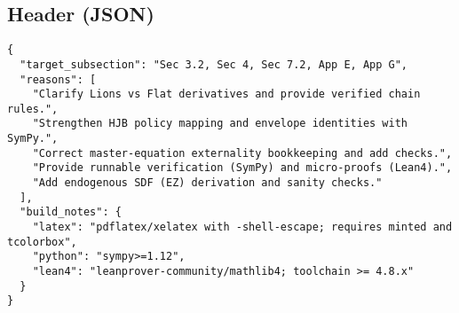 ﻿\documentclass[11pt,letterpaper,oneside]{article}
\numberwithin{equation}{section}
\newcommand{\1}{\mathbf{1}}
\begin{document}
\begin{tcolorbox}[didacticstyle]
\begin{itemize}[leftmargin=1.1em,itemsep=0.25em]
\subsection*{Header (JSON)}
\begin{tcolorbox}[sympycheckstyle,title={Editorial Header (JSON)}]
\begin{Verbatim}[fontsize=\small]
{
  "target_subsection": "Sec 3.2, Sec 4, Sec 7.2, App E, App G",
  "reasons": [
    "Clarify Lions vs Flat derivatives and provide verified chain rules.",
    "Strengthen HJB policy mapping and envelope identities with SymPy.",
    "Correct master-equation externality bookkeeping and add checks.",
    "Provide runnable verification (SymPy) and micro-proofs (Lean4).",
    "Add endogenous SDF (EZ) derivation and sanity checks."
  ],
  "build_notes": {
    "latex": "pdflatex/xelatex with -shell-escape; requires minted and tcolorbox",
    "python": "sympy>=1.12",
    "lean4": "leanprover-community/mathlib4; toolchain >= 4.8.x"
  }
}
\end{Verbatim}
\end{tcolorbox}


\end{itemize}
\end{tcolorbox}
\end{document}
